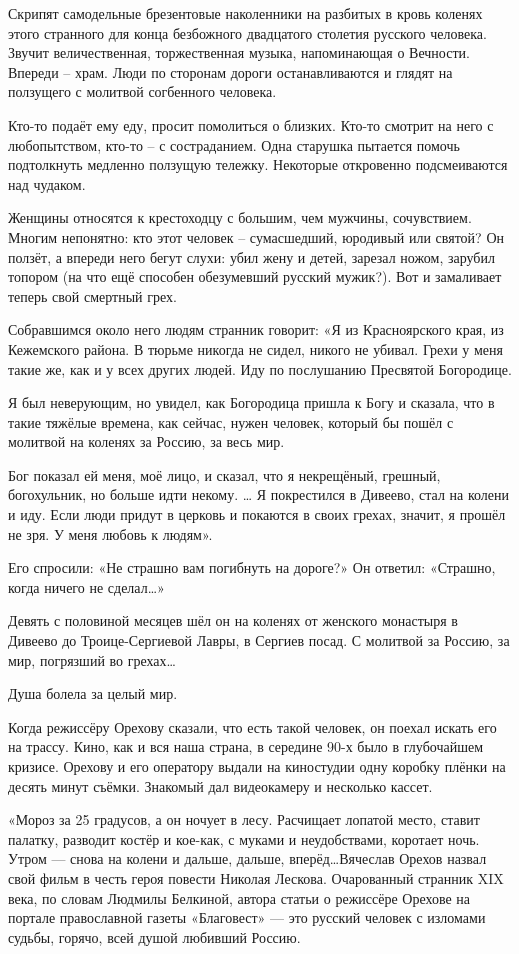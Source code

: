 Скрипят самодельные брезентовые наколенники на разбитых в кровь коленях этого
странного для конца безбожного двадцатого столетия русского человека. Звучит
величественная, торжественная музыка, напоминающая о Вечности. Впереди – храм.
Люди по сторонам дороги останавливаются и глядят на ползущего с молитвой
согбенного человека.

Кто-то подаёт ему еду, просит помолиться о близких. Кто-то смотрит на него с
любопытством, кто-то – с состраданием. Одна старушка пытается помочь
подтолкнуть медленно ползущую тележку. Некоторые откровенно подсмеиваются над
чудаком.

Женщины относятся к крестоходцу с большим, чем мужчины, сочувствием. Многим
непонятно: кто этот человек – сумасшедший, юродивый или святой? Он ползёт, а
впереди него бегут слухи: убил жену и детей, зарезал ножом, зарубил топором (на
что ещё способен обезумевший русский мужик?). Вот и замаливает теперь свой
смертный грех.

Собравшимся около него людям странник говорит: «Я из Красноярского края, из
Кежемского района. В тюрьме никогда не сидел, никого не убивал. Грехи у меня
такие же, как и у всех других людей. Иду по послушанию Пресвятой Богородице.

Я был неверующим, но увидел, как Богородица пришла к Богу и сказала, что в
такие тяжёлые времена, как сейчас, нужен человек, который бы пошёл с молитвой
на коленях за Россию, за весь мир.

Бог показал ей меня, моё лицо, и сказал, что я некрещёный, грешный,
богохульник, но больше идти некому. … Я покрестился в Дивеево, стал на колени и
иду. Если люди придут в церковь и покаются в своих грехах, значит, я прошёл не
зря. У меня любовь к людям».

Его спросили: «Не страшно вам погибнуть на дороге?» Он ответил: «Страшно, когда
ничего не сделал…»

Девять с половиной месяцев шёл он на коленях от женского монастыря в Дивеево до
Троице-Сергиевой Лавры, в Сергиев посад. С молитвой за Россию, за мир,
погрязший во грехах…

Душа болела за целый мир.

Когда режиссёру Орехову сказали, что есть такой человек, он поехал искать его
на трассу. Кино, как и вся наша страна, в середине 90-х было в глубочайшем
кризисе. Орехову и его оператору выдали на киностудии одну коробку плёнки на
десять минут съёмки. Знакомый дал видеокамеру и несколько кассет.

«Мороз за 25 градусов, а он ночует в лесу. Расчищает лопатой место, ставит
палатку, разводит костёр и кое-как, с муками и неудобствами, коротает ночь.
Утром — снова на колени и дальше, дальше, вперёд…Вячеслав Орехов назвал свой
фильм в честь героя повести Николая Лескова. Очарованный странник XIX века, по
словам Людмилы Белкиной, автора статьи о режиссёре Орехове на портале
православной газеты «Благовест» — это русский человек с изломами судьбы,
горячо, всей душой любивший Россию.

